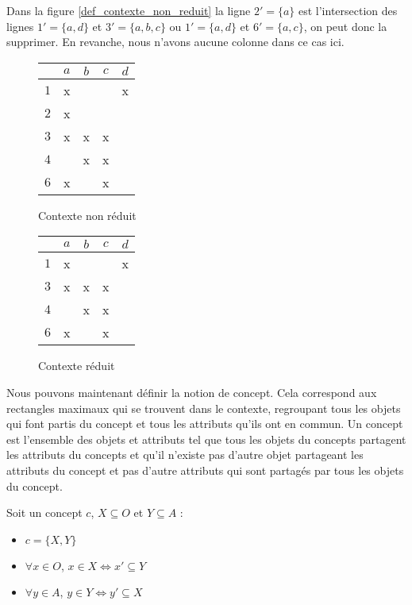 Dans la figure \ref{def_contexte_non_reduit} la ligne $2' = \{a\}$ est l'intersection des lignes $1' = \{a, d\}$ et $3' = \{a, b, c\}$ ou $1' = \{a, d\}$ et $6' = \{a, c\}$, on peut donc la supprimer. En revanche, nous n'avons aucune colonne dans ce cas ici.

\begin{figure}[H]
	\begin{minipage}[c]{0.5\textwidth}
	\begin{center}
		\begin{tabular}{ l | c c c c }
			 & $a$ & $b$ & $c$ & $d$ \\
			\hline
			$1$ & x & & & x \\
			$2$ & x & & & \\
			$3$ & x & x & x & \\
			$4$ & & x & x & \\
			$6$ & x & & x & \\
		\end{tabular}
	\end{center}
	\caption{Contexte non réduit}
	\label{def_contexte_non_reduit}
	\end{minipage}
	\begin{minipage}[c]{0.5\textwidth}
	\begin{center}
		\begin{tabular}{ l | c c c c }
			 & $a$ & $b$ & $c$ & $d$ \\
			\hline
			$1$ & x & & & x \\
			$3$ & x & x & x & \\
			$4$ & & x & x & \\
			$6$ & x & & x & \\
		\end{tabular}
	\end{center}
	\caption{Contexte réduit}
	\label{def_contexte_reduit}
	\end{minipage}
\end{figure}

Nous pouvons maintenant définir la notion de concept. Cela correspond aux rectangles maximaux qui se trouvent dans le contexte, regroupant tous les objets qui font partis du concept et tous les attributs qu'ils ont en commun. Un concept est l'ensemble des objets et attributs tel que tous les objets du concepts partagent les attributs du concepts et qu'il n'existe pas d'autre objet partageant les attributs du concept et pas d'autre attributs qui sont partagés par tous les objets du concept.

\begin{definition}[Concept]
Soit un concept $c$, $X \subseteq O$ et $Y \subseteq A$ :
\begin{itemize}
	\item $c = \{X, Y\}$
	\item $\forall x \in O$, $x \in X \Leftrightarrow x' \subseteq Y$
	\item $\forall y \in A$, $y \in Y \Leftrightarrow y' \subseteq X$
\end{itemize}
\end{definition}

